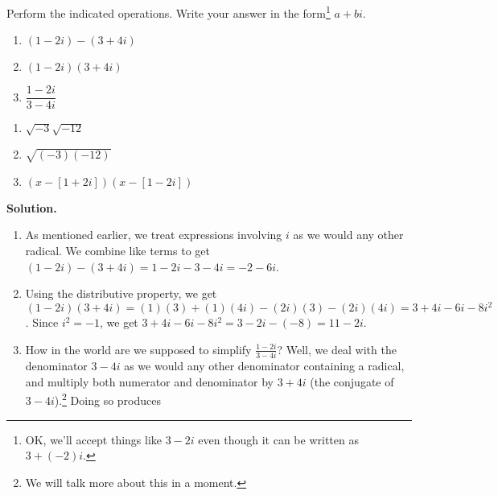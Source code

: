 \begin{ex} \label{complexzeroex1} Perform the indicated operations.  Write your answer in the form\footnote{OK, we'll accept things like $3-2i$ even though it can be written as $3+(-2)i$.} $a+bi$.
\label{complexnumberarithmetic}

\begin{multicols}{3}
\begin{enumerate}

\item  $(1-2i) - (3+4i)$ 
\item  $(1-2i)(3+4i)$ 
\item  $\dfrac{1-2i}{3-4i}$

\setcounter{HW}{\value{enumi}}
\end{enumerate}
\end{multicols}

\begin{multicols}{3}
\begin{enumerate}
\setcounter{enumi}{\value{HW}}

\item  $\sqrt{-3} \sqrt{-12}$
\item  $\sqrt{(-3)(-12)}$
\item  $(x-[1+2i])(x-[1-2i])$

\setcounter{HW}{\value{enumi}}
\end{enumerate}
\end{multicols}

{\bf Solution.} 

\begin{enumerate}

\item  As mentioned earlier, we treat expressions involving $i$ as we would any other radical. We combine like terms to get $(1-2i) - (3+4i) = 1-2i-3-4i = -2-6i$.

\item  Using the distributive property, we get  $(1-2i)(3+4i) = (1)(3) + (1)(4i) - (2i)(3) - (2i)(4i) = 3+4i-6i-8i^2$.  Since $i^2=-1$, we get $3+4i-6i-8i^2 = 3-2i-(-8) = 11-2i$.

\item  How in the world are we supposed to simplify $\frac{1-2i}{3-4i}$?  Well, we deal with the denominator $3-4i$ as we would any other denominator containing a radical, and multiply both numerator and denominator by $3+4i$ (the  conjugate of $3 - 4i$).\footnote{We will talk more about this in a moment.}  Doing so produces


\end{enumerate}
\end{ex}
